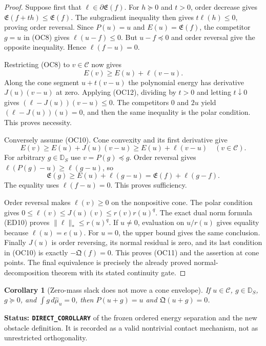 \documentclass[11pt,a4paper]{article}
\numberwithin{equation}{section}
\newtheorem{corollary}[theorem]{Corollary}
\theoremstyle{definition}
\theoremstyle{remark}
\begin{document}
\begin{proof}
Suppose first that $\ell\in\partial\mathfrak E(f)$.
For $h\succeq0$ and $t>0$, order decrease gives
$\mathfrak E(f+th)\le\mathfrak E(f)$.  The subgradient
inequality then gives $t\ell(h)\le0$, proving order reversal.
Since $P(u)=u$ and $E(u)=\mathfrak E(f)$, the competitor
$g=u$ in \textup{(OC8)} gives $\ell(u-f)\le0$.
But $u-f\preceq0$ and order reversal give the opposite
inequality.  Hence $\ell(f-u)=0$.

Restricting \textup{(OC8)} to $v\in\mathscr C$ now gives
\[
                        E(v)\ge E(u)+\ell(v-u).
 \tag{OC12}
\]
Along the cone segment $u+t(v-u)$ the polynomial energy
has derivative $J(u)(v-u)$ at zero.  Applying
\textup{(OC12)}, dividing by $t>0$ and letting $t\downarrow0$
gives $(\ell-J(u))(v-u)\le0$.  The competitors $0$ and
$2u$ yield $(\ell-J(u))(u)=0$, and then the same inequality
is the polar condition.  This proves necessity.

Conversely assume \textup{(OC10)}.  Cone convexity and its
first derivative give
\[
 E(v)\ge E(u)+J(u)(v-u)\ge E(u)+\ell(v-u)
                                     \quad(v\in\mathscr C).
\]
For arbitrary $g\in\mathbb D_S$ use $v=P(g)\preceq g$.
Order reversal gives $\ell(P(g)-u)\ge\ell(g-u)$, so
\[
 \mathfrak E(g)\ge E(u)+\ell(g-u)
                 =\mathfrak E(f)+\ell(g-f).
\]
The equality uses $\ell(f-u)=0$.  This proves sufficiency.

Order reversal makes $\ell(v)\ge0$ on the nonpositive cone.
The polar condition gives
$0\le\ell(v)\le J(u)(v)\le r(v)r(u)^q$.
The exact dual norm formula \textup{(ED10)} proves
$\|\ell\|_*\le r(u)^q$.  If $u\ne0$, evaluation on
$u/r(u)$ gives equality because $\ell(u)=e(u)$.
For $u=0$, the upper bound gives the same conclusion.
Finally $J(u)$ is order reversing, its normal residual is
zero, and its last condition in \textup{(OC10)} is exactly
$-\mathfrak Q(f)=0$.  This proves \textup{(OC11)} and
the assertion at cone points.  The final equivalence is
precisely the already proved normal-decomposition theorem
with its stated continuity gate.
\end{proof}

\begin{corollary}[Zero-mass slack does not move a cone envelope]
\label{cor:r12-zero-mass-obstacle-slack}
If $u\in\mathscr C$, $g\in\mathbb D_S$, $g\succeq0$, and
$\int g\,d\widehat\mu_u=0$, then
$P(u+g)=u$ and $\mathfrak Q(u+g)=0$.
\end{corollary}

\noindent\textbf{Status: \texttt{DIRECT\_COROLLARY}} of
the frozen ordered energy separation and the new obstacle definition.
It is recorded as a valid nontrivial contact mechanism, not as
unrestricted orthogonality.
\end{document}
